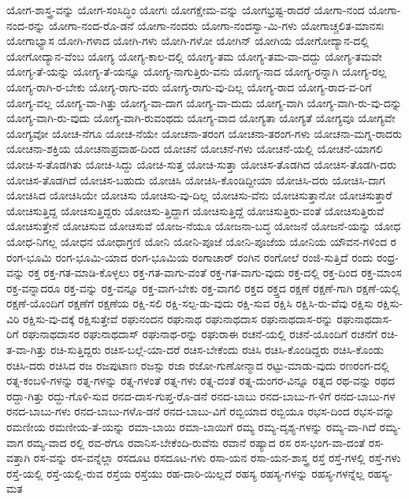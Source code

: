 {ಯೋಗ-ಶಾಸ್ತ್ರ-ವನ್ನು
ಯೋಗ-ಸಂಸಿದ್ಧಿಂ
ಯೋಗಃ
ಯೋಗಕ್ಷೇಮ-ವನ್ನು
ಯೋಗಭ್ರಷ್ಟ-ರಾದರೆ
ಯೋಗಾ-ನಂದ
ಯೋಗಾ-ನಂದ-ರನ್ನು
ಯೋಗಾ-ನಂದ-ರೊ-ಡನೆ
ಯೋಗಾ-ನಂದರು
ಯೋಗಾ-ನಂದಸ್ವಾ-ಮಿ-ಗಳು
ಯೋಗಾಚ್ಚಲಿತ-ಮಾನಸಃ
ಯೋಗಾಭ್ಯಾಸ
ಯೋಗಿ-ಗಳಾದ
ಯೋಗಿ-ಗಳು
ಯೋಗಿ-ಗಳೋ
ಯೋಗಿನ್
ಯೋಗಿಯ
ಯೋಗೋದ್ಯಾನ-ದಲ್ಲಿ
ಯೋಗೋದ್ಯಾನ-ವೆಂಬ
ಯೋಗ್ಯ
ಯೋಗ್ಯ-ಕಾಲ-ದಲ್ಲಿ
ಯೋಗ್ಯ-ತಮ
ಯೋಗ್ಯ-ತಮ-ವಾ-ದದ್ದು
ಯೋಗ್ಯ-ತಮವೇ
ಯೋಗ್ಯ-ತೆ-ಯನ್ನು
ಯೋಗ್ಯ-ತೆ-ಯನ್ನೂ
ಯೋಗ್ಯ-ನಾಗುತ್ತಿರು-ವನು
ಯೋಗ್ಯ-ನಾದ
ಯೋಗ್ಯ-ರನ್ನಾಗಿ
ಯೋಗ್ಯ-ರಲ್ಲ
ಯೋಗ್ಯ-ರಾಗಿ-ರ-ಬೇಕು
ಯೋಗ್ಯ-ರಾಗು-ವರು
ಯೋಗ್ಯ-ರಾಗು-ವು-ದಿಲ್ಲ
ಯೋಗ್ಯ-ರಾದ
ಯೋಗ್ಯ-ರಾದ-ವ-ರಿಗೆ
ಯೋಗ್ಯ-ವಲ್ಲ
ಯೋಗ್ಯ-ವಾ-ಗಿತ್ತು
ಯೋಗ್ಯ-ವಾ-ದಾಗ
ಯೋಗ್ಯ-ವಾ-ದುದು
ಯೋಗ್ಯ-ವಾಗಿ
ಯೋಗ್ಯ-ವಾಗಿ-ರು-ವು-ದನ್ನು
ಯೋಗ್ಯ-ವಾಗಿ-ರು-ವುದು
ಯೋಗ್ಯ-ವಾಗಿ-ರುವಂಥದು
ಯೋಗ್ಯ-ವಾದ
ಯೋಗ್ಯತಾ
ಯೋಗ್ಯತೆ
ಯೋಗ್ಯವೂ
ಯೋಗ್ಯವೇ
ಯೋಗ್ಯವೋ
ಯೋಚ-ನೆಗೂ
ಯೋಚ-ನೆಯೇ
ಯೋಚನಾ-ತರಂಗ
ಯೋಚನಾ-ತರಂಗ-ಗಳು
ಯೋಚನಾ-ಮಗ್ನ-ರಾದರು
ಯೋಚನಾ-ಶಕ್ತಿಯ
ಯೋಚನಾಪ್ರವಾಹ-ದಿಂದ
ಯೋಚನೆ
ಯೋಚನೆ-ಗಳು
ಯೋಚನೆ-ಯಲ್ಲಿ
ಯೋಚನೆ-ಯಾಗಲಿ
ಯೋಚಿ-ಸ-ತೊಡಗಿತು
ಯೋಚಿ-ಸಿದ್ದು
ಯೋಚಿ-ಸುತ್ತ
ಯೋಚಿ-ಸುತ್ತಾ
ಯೋಚಿಸ-ತೊಡಗಿದ
ಯೋಚಿಸ-ತೊಡಗಿ-ದರು
ಯೋಚಿಸ-ತೊಡಗಿದೆ
ಯೋಚಿಸ-ಬಹುದು
ಯೋಚಿಸಿ
ಯೋಚಿಸಿ-ಕೊಂಡಿದ್ದೀಯಾ
ಯೋಚಿಸಿ-ದರು
ಯೋಚಿಸಿ-ದಾಗ
ಯೋಚಿಸಿದ
ಯೋಚಿಸಿಯೇ
ಯೋಚಿಸು
ಯೋಚಿಸು-ವು-ದಿಲ್ಲ
ಯೋಚಿಸು-ವೆನು
ಯೋಚಿಸುತ್ತಾನೋ
ಯೋಚಿಸುತ್ತಾರೆ
ಯೋಚಿಸುತ್ತಿದ್ದ
ಯೋಚಿಸುತ್ತಿದ್ದರು
ಯೋಚಿಸು-ತ್ತಿದ್ದಾಗ
ಯೋಚಿಸುತ್ತಿದ್ದೆ
ಯೋಚಿಸುತ್ತಿರು-ವಂತೆ
ಯೋಚಿಸುತ್ತಿರುವೆ
ಯೋಚಿಸುತ್ತೇನೆ
ಯೋಚಿಸುವ
ಯೋಚಿಸುವೆ
ಯೋಜ-ನೆಯೂ
ಯೋಜನಾ-ಬದ್ಧ
ಯೋಜನೆ
ಯೋಜನೆ-ಯನ್ನು
ಯೋಧ
ಯೋಧ-ನಿಗಲ್ಲ
ಯೋಧನ
ಯೋಧಾಗ್ರಣಿ
ಯೋನಿ
ಯೋನಿ-ಪೂಜೆ
ಯೋನಿ-ಪೂಜೆಯ
ಯೋನಿಯ
ಯೌವನ-ಗಳಿಂದ
ರ
ರಂಗ-ಭೂಮಿ
ರಂಗ-ಭೂಮಿ-ಯಾದ
ರಂಗ-ಭೂಮಿಯ
ರಂಗಾಚಾರ್
ರಂಗಿನ
ರಂಗೋಲೆ
ರಂಜಿ-ಸುತ್ತಿದೆ
ರಂದು
ರಂಧ್ರ-ವನ್ನು
ರಕ್ತ
ರಕ್ತ-ಗತ-ಮಾಡಿ-ಕೊಳ್ಳಲು
ರಕ್ತ-ಗತ-ವಾಗು-ವಂತೆ
ರಕ್ತ-ಗತ-ವಾಗು-ವುದು
ರಕ್ತ-ದಲ್ಲಿ
ರಕ್ತ-ದಿಂದ
ರಕ್ತ-ಮಾಂಸ
ರಕ್ತ-ವನ್ನಾದರೂ
ರಕ್ತ-ವನ್ನು
ರಕ್ತ-ವನ್ನೂ
ರಕ್ತ-ವಾಗ-ಬೇಕು
ರಕ್ತ-ವಾಗಲಿ
ರಕ್ತದ
ರಕ್ತ್ತದ
ರಕ್ಷಣೆ
ರಕ್ಷಣೆ-ಗಾಗಿ
ರಕ್ಷಣೆ-ಯಲ್ಲಿ
ರಕ್ಷಣೆ-ಯೊಂದಿಗೆ
ರಕ್ಷಣೆಗೆ
ರಕ್ಷಣೆಯ
ರಕ್ಷಿ-ಸಲಿ
ರಕ್ಷಿ-ಸಲ್ಪ-ಡು-ವುದು
ರಕ್ಷಿ-ಸುವ
ರಕ್ಷಿಸಿ
ರಕ್ಷಿಸಿ-ರು-ವೆವು
ರಕ್ಷಿಸು
ರಕ್ಷಿಸು-ವಿರಿ
ರಕ್ಷಿಸು-ವು-ದಕ್ಕೆ
ರಕ್ಷಿಸುತ್ತೇವೆ
ರಘುನಂದನ
ರಘುನಾಥ
ರಘುನಾಥದಾಸ
ರಘುನಾಥದಾಸ-ರನ್ನು
ರಘುನಾಥದಾಸ-ರಿಗೆ
ರಘುನಾಥದಾಸರ
ರಘುನಾಥದಾಸ್
ರಘುನಾಥ-ರನ್ನು
ರಘುರಾಈ
ರಚನೆ-ಯಲ್ಲಿ
ರಚನೆ-ಯೊಂದಿಗೆ
ರಚನೆಗೆ
ರಚಿ-ತ-ವಾ-ಗಿತ್ತು
ರಚಿ-ಸುತ್ತಿದ್ದರು
ರಚಿಸ-ಬಲ್ಲೆ-ಯಾ-ದರೆ
ರಚಿಸ-ಬೇಕೆಂದು
ರಚಿಸಿ
ರಚಿಸಿ-ಕೊಂಡಿದ್ದರು
ರಚಿಸಿ-ಕೊಂಡು
ರಚಿಸಿ-ದರು
ರಚಿಸಿದ
ರಜ
ರಜಪುಟಾಣ
ರಜಸ್ಸು
ರಜಾ
ರಜೋ-ಗುಣೋನ್ಮಾದ
ರಟ್ಟು-ಮಾಡು-ವುದು
ರಣರಂಗ-ದಲ್ಲಿ
ರತ್ನ-ಕಂಬಳಿ-ಗಳನ್ನು
ರತ್ನ-ಗಳನ್ನು
ರತ್ನ-ಗಳಂತೆ
ರತ್ನ-ಗಳು
ರತ್ನ-ದಂತೆ
ರತ್ನ-ದುಂಗರ-ವಿನ್ನೂ
ರತ್ನದ
ರಥ-ವನ್ನು
ರಥದ
ರದ್ದಾ-ಗಿತ್ತು
ರದ್ದು-ಗೊಳಿ-ಸುವ
ರನದ-ದಾಸ-ಗುಪ್ತ-ರೊ-ಡನೆ
ರನದ-ಬಾಬು
ರನದ-ಬಾಬು-ಗ-ಳಿಗೆ
ರನದ-ಬಾಬು-ಗಳ
ರನದ-ಬಾಬು-ಗಳು
ರನದ-ಬಾಬು-ಗಳೊ-ಡನೆ
ರನದ-ಬಾಬು-ವಿಗೆ
ರಬ್ಬಿಯಾದ
ರಬ್ಬಿಯೂ
ರಭಸ-ದಿಂದ
ರಭಸ-ವನ್ನು
ರಮಣೀಯ
ರಮಣೀಯ-ತೆ-ಯನ್ನು
ರಮಾ-ಬಾಯಿ
ರಮಾ-ಬಾಯಿಗೆ
ರಮ್ಯ
ರಮ್ಯ-ದೃಶ್ಯ-ಗಳನ್ನು
ರಮ್ಯ-ವಾ-ಗಿದೆ
ರಮ್ಯ-ವಾಗ
ರಮ್ಯ-ವಾದ
ರಲ್ಲಿ
ರವ-ರೆಗೂ
ರವಾನಿಸ-ಬೇಕೆಂದಿ-ರುವೆನು
ರವಾನೆ
ರಷ್ಯಾದ
ರಸ
ರಸ-ಭಂಗ-ವಾ-ದಂತೆ
ರಸ-ವತ್ತಾಗಿ
ರಸ-ವನ್ನು
ರಸ-ವನ್ನೆಲ್ಲಾ
ರಸದೂಟ
ರಸದೂಟ-ಗಳು
ರಸಾ-ಯನ
ರಸಾ-ಯನ-ಶಾಸ್ತ್ರ
ರಸ್ತೆ
ರಸ್ತೆ-ಗಳಲ್ಲಿ
ರಸ್ತೆ-ಗಳು
ರಸ್ತೆ-ಯಲ್ಲಿ
ರಸ್ತೆ-ಯಲ್ಲಿ-ರುವ
ರಸ್ತೆಯ
ರಸ್ತೆಯು
ರಹ-ದಾರಿ-ಯಿಲ್ಲದೆ
ರಹಸ್ಯ
ರಹಸ್ಯ-ಗಳನ್ನು
ರಹಸ್ಯ-ಗಳನ್ನೆಲ್ಲ
ರಹಸ್ಯ-ಮತ
}
